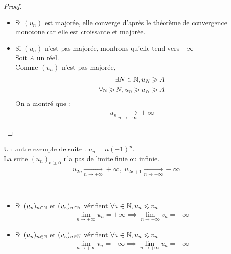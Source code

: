 \begin{proof}~ 
    \begin{itemize}
        \item Si $(u_n)$ est majorée, elle converge d'après le théorème de convergence monotone car elle est croissante et majorée.
        \item Si $(u_n)$ n'est pas majorée, montrons qu'elle tend vers $+\infty$ \\
        Soit $A$ un réel. \\
        Comme $(u_n)$ n'est pas majorée, 
        \begin{align*}
            \exists N \in \mathbb{N}, u_N \geqslant A \\
            \forall n \geqslant N, u_n \geqslant u_N \geqslant A
        \end{align*}
        On a montré que :
        \begin{align*}
            u_n \xrightarrow[n \to +\infty]{} +\infty
        \end{align*}
    \end{itemize}
\end{proof}

\begin{exemple}
    Un autre exemple de suite : $u_n = n(-1)^n$. \\
    La suite $(u_n)_{n \geq 0}$ n'a pas de limite finie ou infinie.
    \begin{align*}
        u_{2n} \xrightarrow[n \to +\infty]{} +\infty,\ u_{2n+1} \xrightarrow[n \to +\infty]{} -\infty
    \end{align*}
\end{exemple}

\begin{theoreme}~ 
    \begin{itemize}
        \item Si $(u_n)_{n \in \mathbb{N}}$ et $(v_n)_{n \in \mathbb{N}}$ vérifient $\forall n \in \mathbb{N}, u_n \leqslant v_n$ 
            \begin{align*}
                \lim_{n \to +\infty} u_n = +\infty \implies \lim_{n \to +\infty} v_n = +\infty
            \end{align*}
        \item Si $(u_n)_{n \in \mathbb{N}}$ et $(v_n)_{n \in \mathbb{N}}$ vérifient $\forall n \in \mathbb{N}, u_n \leqslant v_n$
            \begin{align*}
                \lim_{n \to +\infty} v_n = -\infty \implies \lim_{n \to +\infty} u_n = -\infty
            \end{align*}
    \end{itemize}
\end{theoreme}

